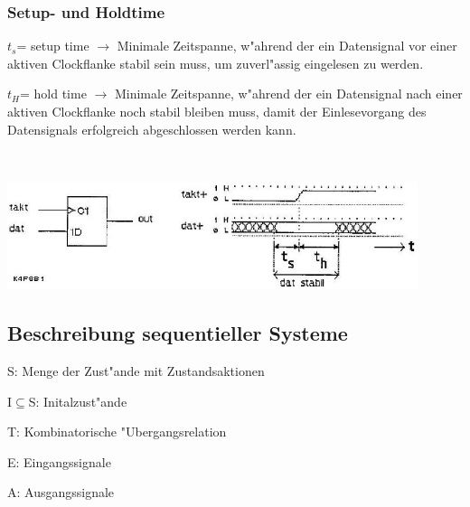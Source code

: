 	\subsubsection{Setup- und Holdtime}
		\begin{minipage}{10 cm}
			\begin{compactitem}
				\item $t_s$= setup time $\rightarrow$ Minimale Zeitspanne, w"ahrend der ein Datensignal vor einer aktiven Clockflanke stabil sein muss, um zuverl"assig eingelesen zu werden.
				\item $t_H$= hold time $\rightarrow$ Minimale Zeitspanne, w"ahrend der ein Datensignal nach einer aktiven Clockflanke noch stabil bleiben muss, damit der Einlesevorgang des Datensignals erfolgreich abgeschlossen werden kann.
			\end{compactitem}
		\end{minipage}
		\begin{minipage}{0.5 cm}
			\ 
		\end{minipage}
		\begin{minipage}{8 cm}
			\includegraphics[width=0.9\textwidth]{pics/setupholdtime}
		\end{minipage}
	\newpage
		
\subsection{Beschreibung sequentieller Systeme}
	\begin{multicols}{2}
		\begin{compactitem}
			\item S: Menge der Zust"ande mit Zustandsaktionen
			\item I$\subseteq$S: Initalzust"ande
			\item T: Kombinatorische "Ubergangsrelation
			\item E: Eingangssignale
			\item A: Ausgangssignale
		\end{compactitem}
	\end{multicols}
	
